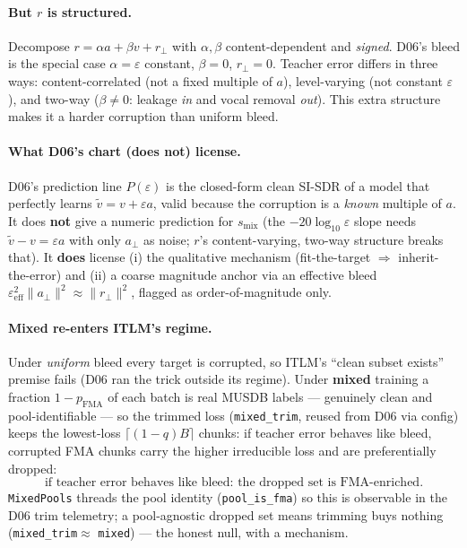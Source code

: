 \documentclass[11pt]{article}
\newcommand{\code}[1]{\texttt{#1}}
\newcommand{\norm}[1]{\lVert #1 \rVert}
\newcommand{\smix}{s_{\text{mix}}}
\newcommand{\pfma}{p_{\text{FMA}}}
\begin{document}
\paragraph{But $r$ is structured.} Decompose $r=\alpha a+\beta v+r_\perp$ with $\alpha,\beta$
content-dependent and \emph{signed}. D06's bleed is the special case $\alpha=\varepsilon$ constant,
$\beta=0$, $r_\perp=0$. Teacher error differs in three ways: content-correlated (not a fixed
multiple of $a$), level-varying (not constant $\varepsilon$), and two-way ($\beta\neq0$: leakage
\emph{in} and vocal removal \emph{out}). This extra structure makes it a harder corruption than
uniform bleed.

\paragraph{What D06's chart (does not) license.} D06's prediction line $P(\varepsilon)$ is the
closed-form clean SI-SDR of a model that perfectly learns $\tilde v=v+\varepsilon a$, valid because
the corruption is a \emph{known} multiple of $a$. It does \textbf{not} give a numeric prediction
for $\smix$ (the $-20\log_{10}\varepsilon$ slope needs $\tilde v-v=\varepsilon a$ with only
$a_\perp$ as noise; $r$'s content-varying, two-way structure breaks that). It \textbf{does} license
(i) the qualitative mechanism (fit-the-target $\Rightarrow$ inherit-the-error) and (ii) a coarse
magnitude anchor via an effective bleed $\varepsilon_{\text{eff}}^2\norm{a_\perp}^2\approx
\norm{r_\perp}^2$, flagged as order-of-magnitude only.

\paragraph{Mixed re-enters ITLM's regime.} Under \emph{uniform} bleed every target is corrupted, so
ITLM's ``clean subset exists'' premise fails (D06 ran the trick outside its regime). Under
\textbf{mixed} training a fraction $1-\pfma$ of each batch is real MUSDB labels --- genuinely clean
and pool-identifiable --- so the trimmed loss (\code{mixed\_trim}, reused from D06 via config) keeps
the lowest-loss $\lceil(1-q)B\rceil$ chunks: if teacher error behaves like bleed, corrupted FMA
chunks carry the higher irreducible loss and are preferentially dropped:
\[
\boxed{\ \text{if teacher error behaves like bleed: the dropped set is FMA-enriched.}\ }
\]
\code{MixedPools} threads the pool identity (\code{pool\_is\_fma}) so this is observable in the D06
trim telemetry; a pool-agnostic dropped set means trimming buys nothing (\code{mixed\_trim}$\approx$
\code{mixed}) --- the honest null, with a mechanism.
\end{document}

